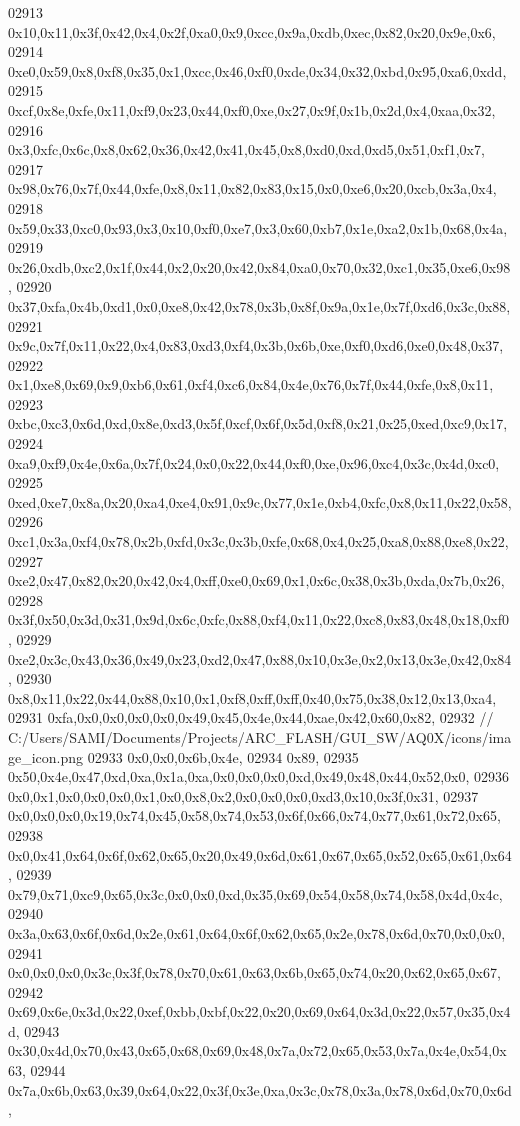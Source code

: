 \begin{DoxyCode}
02913   0x10,0x11,0x3f,0x42,0x4,0x2f,0xa0,0x9,0xcc,0x9a,0xdb,0xec,0x82,0x20,0x9e,0x6,
02914   0xe0,0x59,0x8,0xf8,0x35,0x1,0xcc,0x46,0xf0,0xde,0x34,0x32,0xbd,0x95,0xa6,0xdd,
02915   0xcf,0x8e,0xfe,0x11,0xf9,0x23,0x44,0xf0,0xe,0x27,0x9f,0x1b,0x2d,0x4,0xaa,0x32,
02916   0x3,0xfc,0x6c,0x8,0x62,0x36,0x42,0x41,0x45,0x8,0xd0,0xd,0xd5,0x51,0xf1,0x7,
02917   0x98,0x76,0x7f,0x44,0xfe,0x8,0x11,0x82,0x83,0x15,0x0,0xe6,0x20,0xcb,0x3a,0x4,
02918   0x59,0x33,0xc0,0x93,0x3,0x10,0xf0,0xe7,0x3,0x60,0xb7,0x1e,0xa2,0x1b,0x68,0x4a,
02919   0x26,0xdb,0xc2,0x1f,0x44,0x2,0x20,0x42,0x84,0xa0,0x70,0x32,0xc1,0x35,0xe6,0x98,
02920   0x37,0xfa,0x4b,0xd1,0x0,0xe8,0x42,0x78,0x3b,0x8f,0x9a,0x1e,0x7f,0xd6,0x3c,0x88,
02921   0x9c,0x7f,0x11,0x22,0x4,0x83,0xd3,0xf4,0x3b,0x6b,0xe,0xf0,0xd6,0xe0,0x48,0x37,
02922   0x1,0xe8,0x69,0x9,0xb6,0x61,0xf4,0xc6,0x84,0x4e,0x76,0x7f,0x44,0xfe,0x8,0x11,
02923   0xbc,0xc3,0x6d,0xd,0x8e,0xd3,0x5f,0xcf,0x6f,0x5d,0xf8,0x21,0x25,0xed,0xc9,0x17,
02924   0xa9,0xf9,0x4e,0x6a,0x7f,0x24,0x0,0x22,0x44,0xf0,0xe,0x96,0xc4,0x3c,0x4d,0xc0,
02925   0xed,0xe7,0x8a,0x20,0xa4,0xe4,0x91,0x9c,0x77,0x1e,0xb4,0xfc,0x8,0x11,0x22,0x58,
02926   0xc1,0x3a,0xf4,0x78,0x2b,0xfd,0x3c,0x3b,0xfe,0x68,0x4,0x25,0xa8,0x88,0xe8,0x22,
02927   0xe2,0x47,0x82,0x20,0x42,0x4,0xff,0xe0,0x69,0x1,0x6c,0x38,0x3b,0xda,0x7b,0x26,
02928   0x3f,0x50,0x3d,0x31,0x9d,0x6c,0xfc,0x88,0xf4,0x11,0x22,0xc8,0x83,0x48,0x18,0xf0,
02929   0xe2,0x3c,0x43,0x36,0x49,0x23,0xd2,0x47,0x88,0x10,0x3e,0x2,0x13,0x3e,0x42,0x84,
02930   0x8,0x11,0x22,0x44,0x88,0x10,0x1,0xf8,0xff,0xff,0x40,0x75,0x38,0x12,0x13,0xa4,
02931   0xfa,0x0,0x0,0x0,0x0,0x49,0x45,0x4e,0x44,0xae,0x42,0x60,0x82,
02932     \textcolor{comment}{// C:/Users/SAMI/Documents/Projects/ARC\_FLASH/GUI\_SW/AQ0X/icons/image\_icon.png}
02933   0x0,0x0,0x6b,0x4e,
02934   0x89,
02935   0x50,0x4e,0x47,0xd,0xa,0x1a,0xa,0x0,0x0,0x0,0xd,0x49,0x48,0x44,0x52,0x0,
02936   0x0,0x1,0x0,0x0,0x0,0x1,0x0,0x8,0x2,0x0,0x0,0x0,0xd3,0x10,0x3f,0x31,
02937   0x0,0x0,0x0,0x19,0x74,0x45,0x58,0x74,0x53,0x6f,0x66,0x74,0x77,0x61,0x72,0x65,
02938   0x0,0x41,0x64,0x6f,0x62,0x65,0x20,0x49,0x6d,0x61,0x67,0x65,0x52,0x65,0x61,0x64,
02939   0x79,0x71,0xc9,0x65,0x3c,0x0,0x0,0xd,0x35,0x69,0x54,0x58,0x74,0x58,0x4d,0x4c,
02940   0x3a,0x63,0x6f,0x6d,0x2e,0x61,0x64,0x6f,0x62,0x65,0x2e,0x78,0x6d,0x70,0x0,0x0,
02941   0x0,0x0,0x0,0x3c,0x3f,0x78,0x70,0x61,0x63,0x6b,0x65,0x74,0x20,0x62,0x65,0x67,
02942   0x69,0x6e,0x3d,0x22,0xef,0xbb,0xbf,0x22,0x20,0x69,0x64,0x3d,0x22,0x57,0x35,0x4d,
02943   0x30,0x4d,0x70,0x43,0x65,0x68,0x69,0x48,0x7a,0x72,0x65,0x53,0x7a,0x4e,0x54,0x63,
02944   0x7a,0x6b,0x63,0x39,0x64,0x22,0x3f,0x3e,0xa,0x3c,0x78,0x3a,0x78,0x6d,0x70,0x6d,

\end{DoxyCode}
